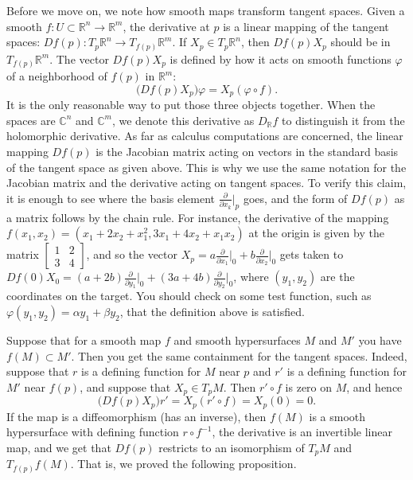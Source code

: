 \documentclass[12pt,openany]{book}
\newcommand{\C}{{\mathbb{C}}}
\newcommand{\R}{{\mathbb{R}}}
\theoremstyle{plain}
\theoremstyle{remark}
\theoremstyle{definition}
\theoremstyle{exercise}
\theoremstyle{example}
\begin{document}
Before we move on, we note how smooth maps transform tangent spaces.
Given a smooth
$f \colon U \subset \R^n \to \R^m$,
the derivative at $p$ is a linear mapping of
the tangent spaces: $Df(p) \colon T_p \R^n \to T_{f(p)} \R^m$.
If $X_p \in T_p \R^n$, then
$Df(p) X_p$ should be in $T_{f(p)} \R^m$.
The vector
$Df(p) X_p$ is defined by how it acts on
smooth functions $\varphi$ of a neighborhood
of $f(p)$ in $\R^m$:
%
\begin{equation*}
\bigl( Df(p) X_p \bigr) \varphi = X_p (\varphi \circ f) .
\end{equation*}
It is the only reasonable way to put those three objects together.
When the spaces are $\C^n$ and $\C^m$, we denote this
derivative as
%
$D_\R f$
to distinguish it from the holomorphic derivative.
As far as calculus computations are concerned,
the linear mapping $Df(p)$ is
the Jacobian matrix acting on vectors in the standard basis of the tangent space
as given above.
This is why we use the same notation for the Jacobian
matrix and the derivative acting on tangent spaces.
To verify this claim, it is enough to see where the basis element
$\frac{\partial}{\partial x_k}\big|_p$ goes, and the form of $Df(p)$
as a matrix
follows by the chain rule.
For instance, the derivative of the mapping $f(x_1,x_2) =
(x_1+2x_2+x_1^2,3x_1+4x_2+x_1x_2)$ at the origin is given by the matrix
$\left[ \begin{smallmatrix} 1 & 2 \\ 3 & 4 \end{smallmatrix} \right]$,
and so the vector
$X_p = a\frac{\partial}{\partial x_1}\big|_0
+
b\frac{\partial}{\partial x_2}\big|_0$
gets taken to
$Df(0) X_0 = (a+2b)\frac{\partial}{\partial y_1}\big|_0
+
(3a+4b)\frac{\partial}{\partial y_2}\big|_0$, where $(y_1,y_2)$ are the
coordinates on the target.  You should check on some test
function, such as
$\varphi(y_1,y_2) = \alpha y_1 + \beta y_2$, that the definition above is
satisfied.

Suppose that for a smooth map $f$ and smooth hypersurfaces $M$ and $M'$
you have $f(M) \subset M'$.  Then you get the same containment for the
tangent spaces.  Indeed, suppose that $r$ is a defining function for $M$
near $p$ and $r'$ is a defining function for $M'$ near $f(p)$, and
suppose that $X_p \in T_p M$.  Then $r' \circ f$ is zero on $M$,
and hence
\begin{equation*}
\bigl( Df(p) X_p \bigr) r' = X_p (r' \circ f) = X_p (0) = 0 .
\end{equation*}
If the map is a diffeomorphism (has an inverse), then $f(M)$ is a smooth
hypersurface with defining function $r \circ f^{-1}$, the derivative is
an invertible linear map, and we get that $Df(p)$ restricts to an
isomorphism of $T_pM$ and $T_{f(p)} f(M)$.  That is, we proved the following
proposition.
\end{document}
